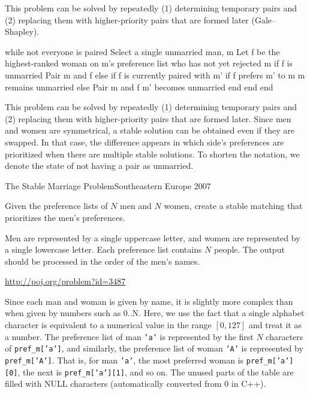This problem can be solved by repeatedly (1) determining temporary pairs and (2) replacing them with higher-priority pairs that are formed later (Gale–Shapley).
\begin{cbox}
while not everyone is paired
  Select a single unmarried man, m
  Let f be the highest-ranked woman on m's preference list who has not yet rejected m
  if f is unmarried
    Pair m and f
  else if f is currently paired with m'
    if f prefers m' to m
      m remains unmarried
    else
      Pair m and f
      m' becomes unmarried
    end
  end
end
\end{cbox}

\medskip

This problem can be solved by repeatedly (1) determining temporary pairs and (2) replacing them with higher-priority pairs that are formed later. Since men and women are symmetrical, a stable solution can be obtained even if they are swapped. In that case, the difference appears in which side's preferences are prioritized when there are multiple stable solutions. To shorten the notation, we denote the state of not having a pair as unmarried.

\begin{pbox}{The Stable Marriage Problem}{Southeastern Europe 2007}

Given the preference lists of $N$ men and $N$ women, create a stable matching that prioritizes the men's preferences.

Men are represented by a single uppercase letter, and women are represented by a single lowercase letter. Each preference list contains $N$ people. The output should be processed in the order of the men's names.

\url{http://poj.org/problem?id=3487}
\end{pbox}

Since each man and woman is given by name, it is slightly more complex than when given by numbers such as 0..N.
Here, we use the fact that a single alphabet character is equivalent to a numerical value in the range $[0,127]$ and treat it as a number.
The preference list of man \texttt{'a'} is represented by the first $N$ characters of \texttt{pref\_m['a']}, and similarly, the preference list of woman \texttt{'A'} is represented by \texttt{pref\_m['A']}.
That is, for man \texttt{'a'}, the most preferred woman is \texttt{pref\_m['a'][0]}, the next is \texttt{pref\_m['a'][1]}, and so on.
The unused parts of the table are filled with NULL characters (automatically converted from 0 in C++).

